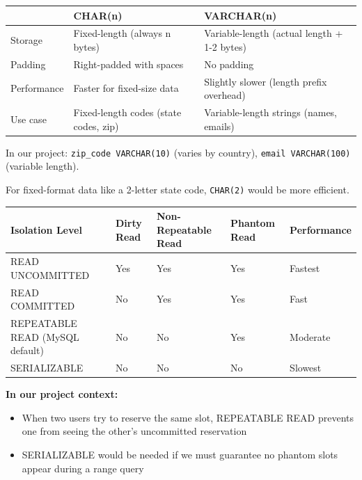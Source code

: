 \documentclass[12pt,a4paper]{article}
\begin{document}
\begin{questionbox}
\end{questionbox}
\begin{answerbox}
\begin{longtable}{@{}lp{5.5cm}p{5.5cm}@{}}
\toprule
& \textbf{CHAR(n)} & \textbf{VARCHAR(n)} \\
\midrule
Storage & Fixed-length (always n bytes) & Variable-length (actual length + 1-2 bytes) \\
Padding & Right-padded with spaces & No padding \\
Performance & Faster for fixed-size data & Slightly slower (length prefix overhead) \\
Use case & Fixed-length codes (state codes, zip) & Variable-length strings (names, emails) \\
\bottomrule
\end{longtable}

In our project: \texttt{zip\_code VARCHAR(10)} (varies by country), \texttt{email VARCHAR(100)} (variable length).

For fixed-format data like a 2-letter state code, \texttt{CHAR(2)} would be more efficient.
\end{answerbox}

\begin{questionbox}
\end{questionbox}
\begin{answerbox}
\begin{longtable}{@{}lp{2cm}p{2cm}p{2cm}p{2cm}@{}}
\toprule
\textbf{Isolation Level} & \textbf{Dirty Read} & \textbf{Non-Repeatable Read} & \textbf{Phantom Read} & \textbf{Performance} \\
\midrule
READ UNCOMMITTED & Yes & Yes & Yes & Fastest \\
READ COMMITTED & No & Yes & Yes & Fast \\
REPEATABLE READ (MySQL default) & No & No & Yes & Moderate \\
SERIALIZABLE & No & No & No & Slowest \\
\bottomrule
\end{longtable}

\textbf{In our project context:}
\begin{itemize}[nosep]
    \item When two users try to reserve the same slot, REPEATABLE READ prevents one from seeing the other's uncommitted reservation
    \item SERIALIZABLE would be needed if we must guarantee no phantom slots appear during a range query
\end{itemize}
\end{answerbox}
\end{document}
